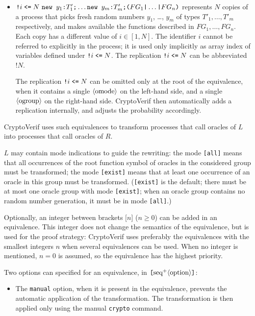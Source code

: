\begin{itemize}
\begin{itemize}
\item $\texttt{!} i \leqt  N\ \Resa{y_1}{T'_1}\texttt{;}
\ldots \Resa{y_m}{T'_m} \texttt{;} \texttt{(}FG_1\texttt{|} \ldots \texttt{|}
FG_n\texttt{)}$ represents $N$ copies of a process that picks fresh
random numbers $y_1$, \ldots, $y_m$ of types $T'_1, \ldots, T'_m$
respectively, and makes available the functions described in $FG_1,
\ldots, FG_n$. Each copy has a different value of $i \in [1, N]$. The
identifier $i$ cannot be referred to explicitly in the process; it is
used only implicitly as array index of variables defined under
$\texttt{!} i \mathrel{\texttt{<=}}  N$.  The replication $\texttt{!} i
\mathrel{\texttt{<=}}  N$ can be abbreviated $\texttt{!} N$.

The replication $\texttt{!} i \mathrel{\texttt{<=}}  N$ can be omitted 
only at the root of the equivalence, when it contains
a single $\langle\textrm{omode}\rangle$ on the left-hand side, and a single $\langle\textrm{ogroup}\rangle$
on the right-hand side. CryptoVerif then automatically
adds a replication internally, and adjusts the probability
accordingly.

\end{itemize}
CryptoVerif uses such equivalences to transform processes that call
oracles of $L$ into processes that call oracles of $R$.

$L$ may contain mode indications to guide the rewriting: the mode
\texttt{[all]} means that all occurrences of the root function symbol
of oracles in the considered group must be transformed;
the mode \texttt{[exist]} means that at least one occurrence of an
oracle in this group must be transformed. (\texttt{[exist]} is the default;
there must be at most one oracle group with mode \texttt{[exist]};
when an oracle group contains no random number generation, it must be in mode 
\texttt{[all]}.)

Optionally, 
an integer between brackets $\texttt{[}n\texttt{]}$ ($n \geq 0$)
can be added in an equivalence.
This integer does not change the semantics of the equivalence, but is
used for the proof strategy: CryptoVerif uses preferably the equivalences
with the smallest integers $n$ when several equivalences can be used.
When no integer is mentioned,
$n = 0$ is assumed, so the equivalence has the highest priority.

Two options can specified for an equivalence, in
$\texttt{[}\textrm{seq}^+\langle\textrm{option}\rangle\texttt{]}$:
\begin{itemize}

\item The \texttt{manual} option, when it is present in the equivalence,
prevents the automatic application of the transformation. The transformation
is then applied only using the manual \texttt{crypto} command.


\end{itemize}
\end{itemize}
